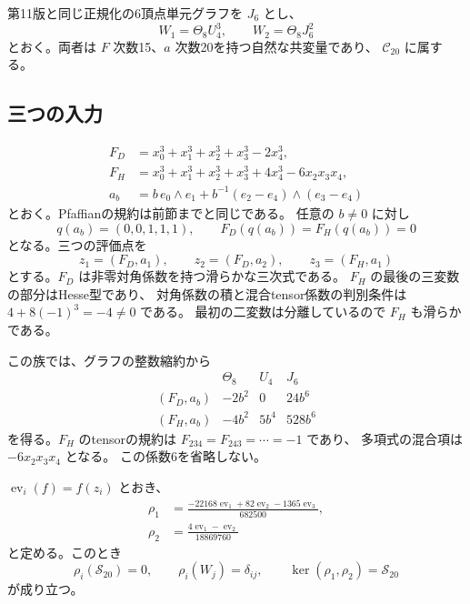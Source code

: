第11版と同じ正規化の6頂点単元グラフを $J_6$ とし、
\[
 W_1=\Theta_8U_4^3,\qquad W_2=\Theta_8J_6^2
\]
とおく。両者は $F$ 次数15、$a$ 次数20を持つ自然な共変量であり、
$\mathcal C_{20}$ に属する。

\subsection{三つの入力}

\begin{align*}
 F_D&=x_0^3+x_1^3+x_2^3+x_3^3-2x_4^3,\\
 F_H&=x_0^3+x_1^3+x_2^3+x_3^3+4x_4^3-6x_2x_3x_4,\\
 a_b&=b\,e_0\wedge e_1
       +b^{-1}(e_2-e_4)\wedge(e_3-e_4)
\end{align*}
とおく。Pfaffianの規約は前節までと同じである。
任意の $b\ne0$ に対し
\[
 q(a_b)=(0,0,1,1,1),\qquad F_D(q(a_b))=F_H(q(a_b))=0
\]
となる。三つの評価点を
\[
 z_1=(F_D,a_1),\qquad z_2=(F_D,a_2),\qquad z_3=(F_H,a_1)
\]
とする。$F_D$ は非零対角係数を持つ滑らかな三次式である。
$F_H$ の最後の三変数の部分はHesse型であり、
対角係数の積と混合tensor係数の判別条件は $4+8(-1)^3=-4\ne0$ である。
最初の二変数は分離しているので $F_H$ も滑らかである。

この族では、グラフの整数縮約から
\[
\begin{array}{c|ccc}
 &\Theta_8&U_4&J_6\\\hline
(F_D,a_b)&-2b^2&0&24b^6\\
(F_H,a_b)&-4b^2&5b^4&528b^6
\end{array}
\]
を得る。$F_H$ のtensorの規約は
$F_{234}=F_{243}=\cdots=-1$ であり、
多項式の混合項は $-6x_2x_3x_4$ となる。
この係数6を省略しない。

\begin{proposition}[三点の厳密な双対汎関数]
\label{prop:v15-exact-dual-detectors}
$\operatorname{ev}_i(f)=f(z_i)$ とおき、
\begin{align}
 \rho_1&=\frac{-22168\operatorname{ev}_1+82\operatorname{ev}_2
                    -1365\operatorname{ev}_3}{682500},
                    \label{eq:v15-rho1}\\
 \rho_2&=\frac{4\operatorname{ev}_1-\operatorname{ev}_2}{18869760}
                    \label{eq:v15-rho2}
\end{align}
と定める。このとき
\[
 \rho_i(\mathcal S_{20})=0,\qquad
 \rho_i(W_j)=\delta_{ij},\qquad
 \ker(\rho_1,\rho_2)=\mathcal S_{20}
\]
が成り立つ。
\end{proposition}

